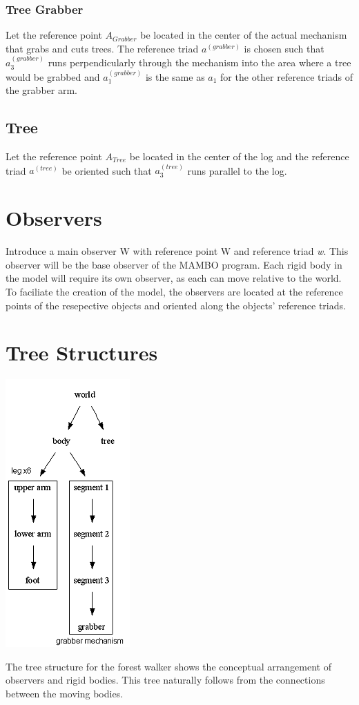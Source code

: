 \documentclass{article}
\begin{document}
\subsubsection{Tree Grabber}%
Let the reference point $A_{Grabber}$ be located in the center of the actual mechanism that grabs and cuts trees. The reference triad $a^{(grabber)}$ is chosen such that $a_3^{(grabber)}$ runs perpendicularly through the mechanism into the area where a tree would be grabbed and $a_1^{(grabber)}$ is the same as $a_1$ for the other reference triads of the grabber arm.%

\subsection{Tree} %
Let the reference point $A_{Tree}$ be located in the center of the log and the reference triad $a^{(tree)}$ be oriented such that $a_3^{(tree)}$ runs parallel to the log.%

\section{Observers} %
Introduce a main observer W with reference point W and reference triad \textit{w}. This observer will be the base observer of the MAMBO program. Each rigid body in the model will require its own observer, as each can move relative to the world. To faciliate the creation of the model, the observers are located at the reference points of the resepective objects and oriented along the objects' reference triads.%

\section{Tree Structures} %
\begin{center}
\includegraphics{forestwalkertree.png}
\end{center}
The tree structure for the forest walker shows the conceptual arrangement of observers and rigid bodies. This tree naturally follows from the connections between the moving bodies.%
\end{document}
